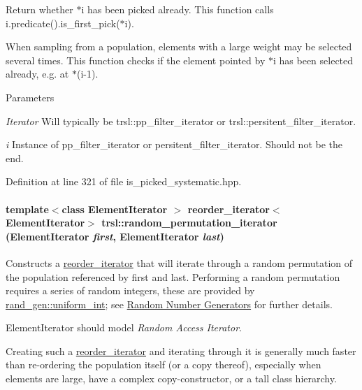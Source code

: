 Return whether {\ttfamily $\ast$i} has been picked already. This function calls {\ttfamily i.predicate().is\_\-first\_\-pick($\ast$i)}.

When sampling from a population, elements with a large weight may be selected several times. This function checks if the element pointed by {\ttfamily $\ast$i} has been selected already, e.g. at {\ttfamily $\ast$(i-\/1)}.


\begin{DoxyParams}{Parameters}
\item[{\em Iterator}]Will typically be trsl::pp\_\-filter\_\-iterator or trsl::persitent\_\-filter\_\-iterator.\item[{\em i}]Instance of pp\_\-filter\_\-iterator or persitent\_\-filter\_\-iterator. Should not be the end. \end{DoxyParams}


Definition at line 321 of file is\_\-picked\_\-systematic.hpp.\hypertarget{namespacetrsl_a1d987a0f24b3d75783119747c4a22723}{
\paragraph[{random\_\-permutation\_\-iterator}]{\setlength{\rightskip}{0pt plus 5cm}template$<$class ElementIterator $>$ {\bf reorder\_\-iterator}$<$ElementIterator$>$ trsl::random\_\-permutation\_\-iterator (ElementIterator {\em first}, \/  ElementIterator {\em last})}\hfill}
\label{namespacetrsl_a1d987a0f24b3d75783119747c4a22723}


Constructs a \hyperlink{classtrsl_1_1reorder__iterator}{reorder\_\-iterator} that will iterate through a random permutation of the population referenced by {\ttfamily first} and {\ttfamily last}. Performing a random permutation requires a series of random integers, these are provided by \hyperlink{namespacetrsl_1_1rand__gen_a8b8ab155014f708c35fb7594c8d13a81}{rand\_\-gen::uniform\_\-int}; see \hyperlink{group__random}{Random Number Generators} for further details.

{\ttfamily ElementIterator} should model {\itshape Random Access Iterator\/}.

Creating such a \hyperlink{classtrsl_1_1reorder__iterator}{reorder\_\-iterator} and iterating through it is generally much faster than re-\/ordering the population itself (or a copy thereof), especially when elements are large, have a complex copy-\/constructor, or a tall class hierarchy. 

